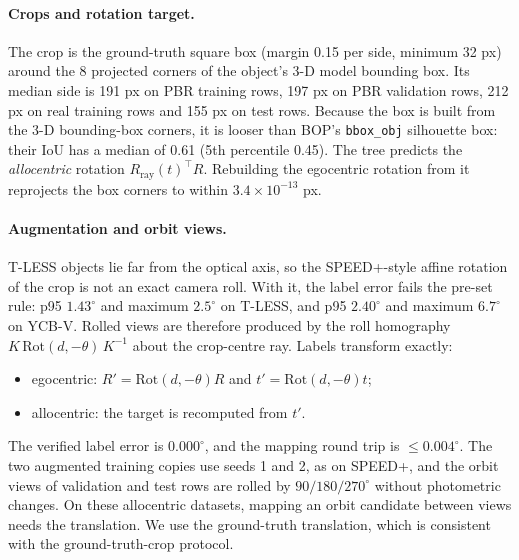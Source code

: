 \paragraph{Crops and rotation target.}
The crop is the ground-truth square box (margin 0.15 per side, minimum 32 px) around the 8 projected corners of the object's 3-D model bounding box. Its median side is 191 px on PBR training rows, 197 px on PBR validation rows, 212 px on real training rows and 155 px on test rows. Because the box is built from the 3-D bounding-box corners, it is looser than BOP's \texttt{bbox\_obj} silhouette box: their IoU has a median of 0.61 (5th percentile 0.45).
The tree predicts the \emph{allocentric} rotation $R_{\text{ray}}(t)^\top R$. Rebuilding the egocentric rotation from it reprojects the box corners to within $3.4\times10^{-13}$ px.

\paragraph{Augmentation and orbit views.}
T-LESS objects lie far from the optical axis, so the SPEED+-style affine rotation of the crop is not an exact camera roll. With it, the label error fails the pre-set rule: p95 $1.43^\circ$ and maximum $2.5^\circ$ on T-LESS, and p95 $2.40^\circ$ and maximum $6.7^\circ$ on YCB-V. Rolled views are therefore produced by the roll homography $K\,\mathrm{Rot}(d,-\theta)\,K^{-1}$ about the crop-centre ray. Labels transform exactly:
\begin{itemize}
  \item egocentric: $R'=\mathrm{Rot}(d,-\theta)R$ and $t'=\mathrm{Rot}(d,-\theta)t$;
  \item allocentric: the target is recomputed from $t'$.
\end{itemize}
The verified label error is $0.000^\circ$, and the mapping round trip is $\le0.004^\circ$.
The two augmented training copies use seeds 1 and 2, as on SPEED+, and the orbit views of validation and test rows are rolled by $90/180/270^\circ$ without photometric changes. On these allocentric datasets, mapping an orbit candidate between views needs the translation. We use the ground-truth translation, which is consistent with the ground-truth-crop protocol.

